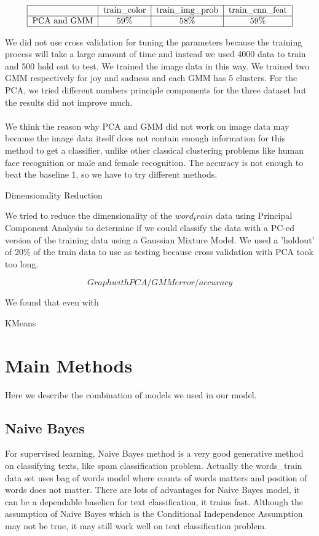 \documentclass[]{article}
\begin{document}
\[
\begin{tabular}{|c|c|c|c|}
\hline &train\_color & train\_img\_prob & train\_cnn\_feat\\
\hline PCA and GMM&59\%&58\%&59\%\\
\hline
\end{tabular}
\]

We did not use cross validation for tuning the parameters because the training process will take a large amount of time and instead we used 4000 data to train and 500 hold out to test. We trained the image data in this way. We trained two GMM respectively for joy and sadness and each GMM has 5 clusters. For the PCA, we tried different numbers principle components for the three dataset but the results did not improve much.\\\\

We think the reason why PCA and GMM did not work on image data may because the image data itself does not contain enough information for this method to get a classifier, unlike other classical clustering problems like human face recognition or male and female recognition. The accuracy is not enough to beat the baseline 1, so we have to try different methods.

Dimensionality Reduction

We tried to reduce the dimensionality of the $word_train$ data using Principal Component Analysis to determine if we could classify the data with a PC-ed version of the training data using a Gaussian Mixture Model. We used a 'holdout' of 20\% of the train data to use as testing because cross validation with PCA took too long.  

$$Graph with PCA/GMM error/accuracy$$

We found that even with 

KMeans 


\section{Main Methods}

Here we describe the combination of models we used in our model. 


\subsection{Naive Bayes}

For supervised learning, Naive Bayes method is a very good generative method on classifying texts, like spam classification problem. Actually the words\_train data set uses bag of words model where counts of words matters and position of words does not matter. There are lots of advantages for Naive Bayes model, it can be a dependable baselien for text classification, it trains fast. Although the assumption of Naive Bayes which is the Conditional Independence Assumption may not be true, it may still work well on text classification problem.\\\\
\end{document}
